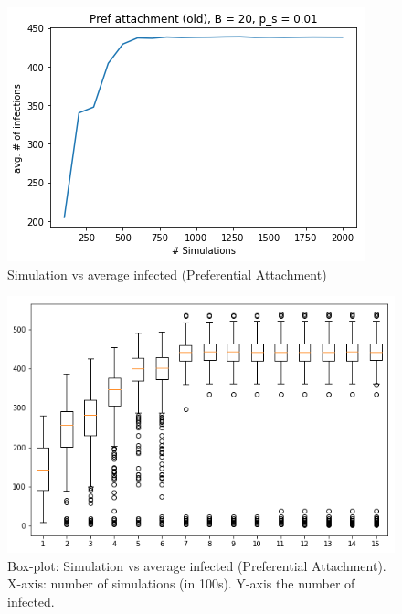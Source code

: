 \begin{figure}[!h]
    \centering
    \includegraphics[scale = 0.6]{Figuresnew/simulations.png}
    \caption{Simulation vs average infected (Preferential Attachment)}
    \label{fig:pa_simvsavg}
\end{figure}
 
\begin{figure}[!h]
    \centering
    \includegraphics[scale = 0.4]{Figuresnew/boxplotpa.png}
    \caption{Box-plot: Simulation vs average infected (Preferential Attachment). X-axis: number of simulations (in 100s). Y-axis the number of infected.}
    \label{fig:pa_boxplot}
\end{figure}

